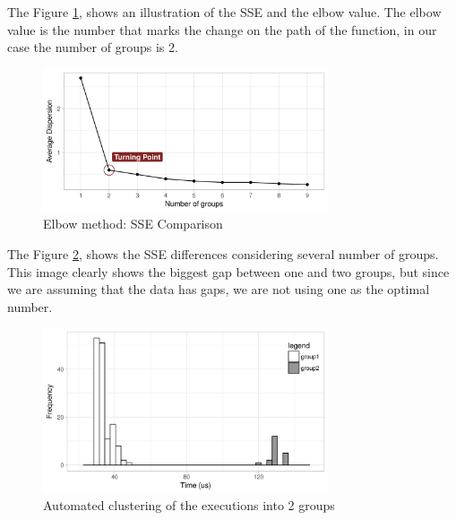     The Figure \ref{fig:sse}, shows an illustration of the SSE and the elbow value. The elbow value is the number that marks the change on the path of the function, in our case the number of groups is 2. 
     \begin{figure}[h]
     \vspace{-10pt}
      \centering
        \includegraphics[width=0.750\textwidth]{figures/sse-groups.png}
        \caption{Elbow method: SSE Comparison}
        \label{fig:sse}
        \vspace{-10pt}
    \end{figure}
    
    The Figure \ref{fig:grouping-hist}, shows the SSE differences considering several number of groups. This image clearly shows the biggest gap between one and two groups, but since we are assuming that the data has gaps, we are not using one as the optimal number.
    
    \begin{figure}[h]
      \centering
        \includegraphics[width=0.75\textwidth]{figures/grouping-hist.png}
        \caption{Automated clustering of the executions into 2 groups}
        \label{fig:grouping-hist}
        \vspace{-10pt}
    \end{figure}

    
